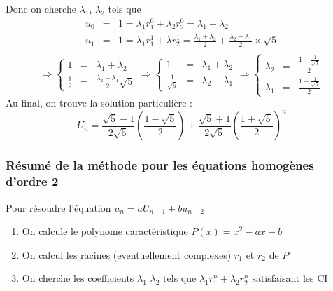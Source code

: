	Donc on cherche $\lambda_1$, $\lambda_2$ tels que
	\begin{eqnarray*}
		u_0 &=&  1 = \lambda_1 r^0_1 + \lambda_2r_2^0 = \lambda_1 + \lambda_2\\
		u_1&=&  1 = \lambda_1 r^1_1 + \lambda r^1_2 = \frac{\lambda_1 + \lambda_2}{2} + \frac{\lambda_2 - \lambda _ 1}{2} \times \sqrt{5}\\
	\end{eqnarray*}
	\begin{displaymath}
		\Rightarrow 
		\left\{ \begin{array}{lll}
			1 &=&  \lambda_1 + \lambda_2\\
			\frac{1}{2} &=& \frac{\lambda_2 - \lambda_1}{2}\sqrt{5}
		\end{array} \right.
		\Rightarrow 
		\left\{ \begin{array}{lll}
			1 &=&  \lambda_1 + \lambda_2\\
			\frac{1}{\sqrt{5}} &=& \lambda_2 - \lambda_1
		\end{array} \right.
		\Rightarrow 
		\left\{ \begin{array}{lll}
			\lambda_2 &=&  \frac{1+\frac{1}{\sqrt{5}}}{2}\\
			\lambda_1 &=&  \frac{1-\frac{1}{\sqrt{5}}}{2}
		\end{array} \right.
	\end{displaymath}
	Au final, on trouve la solution particulière : 
	$$U_n = \frac{\sqrt{5}-1}{2\sqrt{5}}(\frac{1-\sqrt{5}}{2}) + \frac{\sqrt{5}+1}{2\sqrt{5}}(\frac{1+\sqrt{5}}{2})^n$$
	
	\subsubsection{Résumé de la méthode pour les équations homogènes d'ordre 2}
	Pour résoudre l'équation $u_n = aU_{n-1} + bu_{n-2}$
	\begin{enumerate}
		\item On calcule le polynome caractéristique $P(x) = x^2 - ax -b$
		\item On calcul les racines (eventuellement complexes)
			$r_1$ et $r_2$ de $P$
		\item On cherche les coefficients $\lambda_1$ $\lambda_2$ tels que $\lambda_1r_1^n + \lambda_2r_2^n$ satisfaisant les CI
	\end{enumerate}


